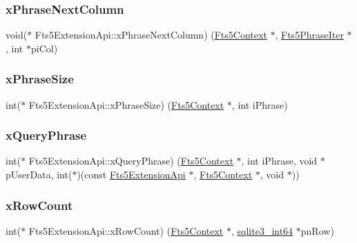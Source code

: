 \subsubsection{\texorpdfstring{xPhraseNextColumn}{xPhraseNextColumn}}
{\footnotesize\ttfamily void($\ast$ Fts5\+Extension\+Api\+::x\+Phrase\+Next\+Column) (\mbox{\hyperlink{sqlite3_8h_a97821b95ebebd43db901977ffd5b26bc}{Fts5\+Context}} $\ast$, \mbox{\hyperlink{struct_fts5_phrase_iter}{Fts5\+Phrase\+Iter}} $\ast$, int $\ast$pi\+Col)}

\mbox{\label{struct_fts5_extension_api_aeda6faa66f47f9116c9ceba882aaedd2}} 
\subsubsection{\texorpdfstring{xPhraseSize}{xPhraseSize}}
{\footnotesize\ttfamily int($\ast$ Fts5\+Extension\+Api\+::x\+Phrase\+Size) (\mbox{\hyperlink{sqlite3_8h_a97821b95ebebd43db901977ffd5b26bc}{Fts5\+Context}} $\ast$, int i\+Phrase)}

\mbox{\label{struct_fts5_extension_api_a8f6dcf0a1d246b235f98f5bbb214e28d}} 
\subsubsection{\texorpdfstring{xQueryPhrase}{xQueryPhrase}}
{\footnotesize\ttfamily int($\ast$ Fts5\+Extension\+Api\+::x\+Query\+Phrase) (\mbox{\hyperlink{sqlite3_8h_a97821b95ebebd43db901977ffd5b26bc}{Fts5\+Context}} $\ast$, int i\+Phrase, void $\ast$p\+User\+Data, int($\ast$)(const \mbox{\hyperlink{struct_fts5_extension_api}{Fts5\+Extension\+Api}} $\ast$, \mbox{\hyperlink{sqlite3_8h_a97821b95ebebd43db901977ffd5b26bc}{Fts5\+Context}} $\ast$, void $\ast$))}

\mbox{\label{struct_fts5_extension_api_ae1eb7ad1d3c131a09376134ecc099568}} 
\subsubsection{\texorpdfstring{xRowCount}{xRowCount}}
{\footnotesize\ttfamily int($\ast$ Fts5\+Extension\+Api\+::x\+Row\+Count) (\mbox{\hyperlink{sqlite3_8h_a97821b95ebebd43db901977ffd5b26bc}{Fts5\+Context}} $\ast$, \mbox{\hyperlink{sqlite3_8h_a0a4d3e6c1ad46f90e746b920ab6ca0d2}{sqlite3\+\_\+int64}} $\ast$pn\+Row)}

